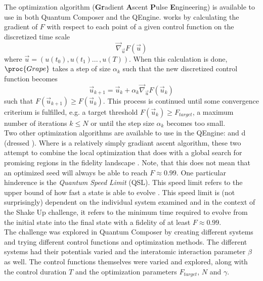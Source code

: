 \documentclass[a4paper, twocolumn]{revtex4-1}
\begin{document}
The optimization algorithm  (\textbf{Gr}adient \textbf Ascent \textbf Pulse \textbf Engineering) is available to use in both Quantum Composer and the QEngine.  works by calculating the gradient of $F$ with respect to each point of a given control function on the discretized time scale 
\begin{equation}
	\vec{\nabla}_{\vec{u}}F(\vec{u})
\end{equation}
where $\vec{u} = (u(t_0), u(t_1) ... \,, u(T))$. When this calculation is done, $\proc{Grape}$ takes a step of size $\alpha_k$ such that the new discretized control function becomes
\begin{equation}
	\vec{u}_{k+1} = \vec{u}_{k} + \alpha_k \vec{\nabla}_{\vec{u}}F(\vec{u}_k)
\end{equation}
such that $F(\vec{u}_{k+1}) \geq F(\vec{u}_{k})$. This process is continued until some convergence criterium is fulfilled, e.g. a target threshold $F(\vec{u}_{k}) \geq F_{target}$, a maximum number of iterations $k \leq N$ or until the step size $\alpha_k$ becomes too small. \\

Two other optimization algorithms are available to use in the QEngine:  and d (dressed ). Where  is a relatively simply gradiant ascent algorithm, these two attempt to combine the local optimization that  does with a global search for promising regions in the fidelity landscape \cite{GroupPaper, QEngine}. 
Note, that this does not mean that an optimized seed will always be able to reach $F\approx0.99$. One particular hinderence is the \textit{Quantum Speed Limit} (QSL). This speed limit refers to the upper bound of how fast a state is able to evolve \cite{Deffner_2017}. This speed limit is (not surprisingly) dependent on the individual system examined and in the context of the Shake Up challenge, it refers to the minimum time required to evolve from the initial state into the final state with a fidelity of at least $F\approx 0.99$. \\

The challenge was explored in Quantum Composer by creating different systems and trying different control functions and optimization methods. The different systems had their potentials varied and the interatomic interaction parameter $\beta$ as well. The control functions themselves were varied and explored, along with the control duration $T$ and the  optimization parameters $F_{target}$, $N$ and $\gamma$.
\end{document}
